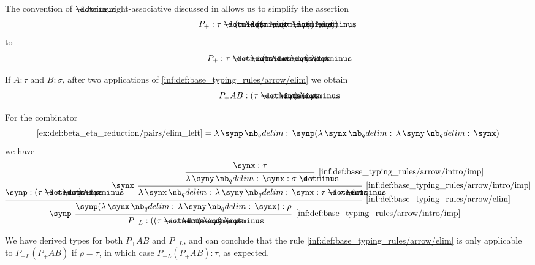 \begin{example}
\begin{thmenum}
    The convention of \( \synimplies \) being right-associative discussed in  allows us to simplify the assertion
    \begin{equation*}
      P_+: \tau \synimplies (\sigma \synimplies ((\tau \synimplies (\sigma \synimplies \rho)) \synimplies \rho))
    \end{equation*}
    to
    \begin{equation*}
      P_+: \tau \synimplies \sigma \synimplies (\tau \synimplies \sigma \synimplies \rho) \synimplies \rho.
    \end{equation*}

    If \( A: \tau \) and \( B: \sigma \), after two applications of \ref{inf:def:base_typing_rules/arrow/elim} we obtain
    \begin{equation*}
      P_+ A B: (\tau \synimplies \sigma \synimplies \rho) \synimplies \rho.
    \end{equation*}

    For the combinator
    \begin{equation*}
      \ref{ex:def:beta_eta_reduction/pairs/elim_left} = \qabs \synp \synp (\qabs \synx \qabs \syny \synx)
    \end{equation*}
    we have
    \begin{equation*}
      \begin{prooftree}
        \hypo{ \synp: (\tau \synimplies \sigma \synimplies \tau) \synimplies \rho }

        \hypo{ \synx: \tau }
        \infer1[\ref{inf:def:base_typing_rules/arrow/intro/imp}]{ \qabs \syny \synx: \sigma \synimplies \tau }
        \infer[left label=\( \synx \)]1[\ref{inf:def:base_typing_rules/arrow/intro/imp}]{ \qabs \synx \qabs \syny \synx: \tau \synimplies \sigma \synimplies \tau }

        \infer2[\ref{inf:def:base_typing_rules/arrow/elim}]{ \synp (\qabs \synx \qabs \syny \synx): \rho }
        \infer[left label=\( \synp \)]1[\ref{inf:def:base_typing_rules/arrow/intro/imp}]{ P_{-L}: ((\tau \synimplies \sigma \synimplies \tau) \synimplies \rho) \synimplies \rho }
      \end{prooftree}
    \end{equation*}

    We have derived types for both \( P_+ A B \) and \( P_{-L} \), and can conclude that the rule \ref{inf:def:base_typing_rules/arrow/elim} is only applicable to \( P_{-L} (P_+ A B) \) if \( \rho = \tau \), in which case \( P_{-L} (P_+ A B): \tau \), as expected.


\end{thmenum}
\end{example}
